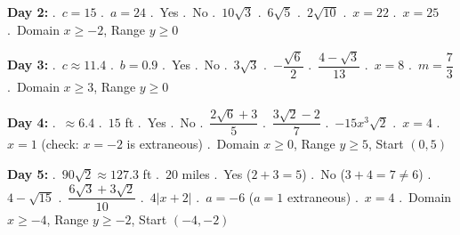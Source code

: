 \documentclass[11pt]{article}
\begin{document}
\medskip
\begin{ansbox}
\textbf{Day 2:} .~$c=15$ .~$a=24$ .~Yes .~No .~$10\sqrt{3}$ .~$6\sqrt{5}$ .~$2\sqrt{10}$ .~$x=22$ .~$x=25$ .~Domain $x\ge-2$, Range $y\ge0$
\end{ansbox}

\medskip
\begin{ansbox}
\textbf{Day 3:} .~$c\approx11.4$ .~$b=0.9$ .~Yes .~No .~$3\sqrt{3}$ .~$-\dfrac{\sqrt{6}}{2}$ .~$\dfrac{4-\sqrt{3}}{13}$ .~$x=8$ .~$m=\dfrac{7}{3}$ .~Domain $x\ge3$, Range $y\ge0$
\end{ansbox}

\medskip
\begin{ansbox}
\textbf{Day 4:} .~$\approx6.4$ .~$15$ ft .~Yes .~No .~$\dfrac{2\sqrt{6}+3}{5}$ .~$\dfrac{3\sqrt{2}-2}{7}$ .~$-15x^3\sqrt{2}$ .~$x=4$ .~$x=1$ (check: $x=-2$ is extraneous) .~Domain $x\ge0$, Range $y\ge5$, Start $(0,5)$
\end{ansbox}

\medskip
\begin{ansbox}
\textbf{Day 5:} .~$90\sqrt{2}\approx127.3$ ft .~$20$ miles .~Yes ($2+3=5$) .~No ($3+4=7\ne6$) .~$4-\sqrt{15}$ .~$\dfrac{6\sqrt{3}+3\sqrt{2}}{10}$ .~$4|x+2|$ .~$a=-6$ ($a=1$ extraneous) .~$x=4$ .~Domain $x\ge-4$, Range $y\ge-2$, Start $(-4,-2)$
\end{ansbox}
\end{document}
